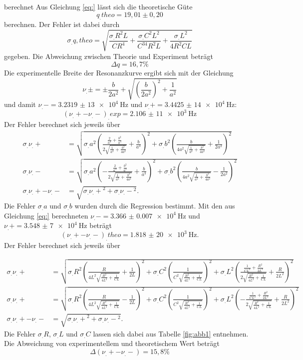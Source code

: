 berechnet
Aus Gleichung \eqref{eq:} lässt sich die theoretische Güte 
\[
q_.{theo}=19,01\pm 0,20
\] 
berechnen.
Der Fehler ist dabei durch 
\[
\sigma_.{q,theo}=\sqrt{\frac{\sigma_.R^2L}{CR^4}+\frac{\sigma_.C^2L^2}{C^34R^2L}+\frac{\sigma_.L^2}{4R^2CL}}
\]
gegeben.
Die Abweichung zwischen Theorie und Experiment beträgt
\[
\Delta q = 16,7\%
\]
Die experimentelle Breite der Resonanzkurve ergibt sich mit der Gleichung 
\[
\nu_.{\pm}=\pm\frac{b}{2a^2}+\sqrt{\left(\frac{b}{2a^2}\right)^2+\frac{1}{a^2}}
\]
und damit $\nu_.-=\SI{3,2319(13)e4}{\hertz}$ und $\nu_.+=\SI{3,4425(14)e4}{\hertz}$:
\[
\left(\nu_.+-\nu_.-\right)_.{exp}=\SI{2,106(11)e3}{\hertz}
\]
Der Fehler berechnet sich jeweils über
\begin{align*}
\sigma_.{\nu_.+}&=\sqrt{\sigma_.a^2\left(\frac{\frac{2}{a^3}+\frac{b^2}{a^5}}{2\sqrt{\frac{1}{a^2}+\frac{b^2}{4a^2}}}+\frac{b}{a^3}\right)^2+\sigma_.b^2\left(\frac{b}{4a^2\sqrt{\frac{1}{a^2}+\frac{b^2}{4a^2}}}+\frac{1}{2a^2}\right)^2} \\
\sigma_.{\nu_.-}&=\sqrt{\sigma_.a^2\left(-\frac{\frac{2}{a^3}+\frac{b^2}{a^5}}{2\sqrt{\frac{1}{a^2}+\frac{b^2}{4a^2}}}+\frac{b}{a^3}\right)^2+\sigma_.b^2\left(\frac{b}{4a^2\sqrt{\frac{1}{a^2}+\frac{b^2}{4a^2}}}-\frac{1}{2a^2}\right)^2} \\
\sigma_.{\nu_.+-\nu_.-}&=\sqrt{\sigma_.{\nu_.+}^2+\sigma_.{\nu_.-}^2}\text{.}
\end{align*}
Die Fehler $\sigma_.a$ und $\sigma_.b$ wurden durch die Regression bestimmt.
Mit den aus Gleichung \eqref{eq:} berechneten $\nu_.-=\SI{3.366(7)e4}{\hertz}$ und 
$\nu_.+=\SI{3,548(7)e4}{\hertz}$ beträgt
\[
\left(\nu_.+-\nu_.-\right)_.{theo}=\SI{1,818(20)e3}{\hertz}\text{.}
\]
Der Fehler berechnet sich jeweils über

\begin{align*}
\sigma_.{\nu_.+}&=\sqrt{\sigma_.R^2\left(\frac{R}{4L^2\sqrt{\frac{R^2}{4L^2}+\frac{1}{CL}}}+\frac{1}{2L}\right)^2+\sigma_.C^2\left(\frac{1}{C^2\sqrt{\frac{R^2}{4L^2}+\frac{1}{CL}}}\right)^2+\sigma_.L^2\left(\frac{\frac{1}{CL^2}+\frac{R^2}{2L^3}}{2\sqrt{\frac{R^2}{4L^2}+\frac{1}{CL}}}+\frac{R}{2L^2}\right)^2} \\
\sigma_.{\nu_.+}&=\sqrt{\sigma_.R^2\left(\frac{R}{4L^2\sqrt{\frac{R^2}{4L^2}+\frac{1}{CL}}}-\frac{1}{2L}\right)^2+\sigma_.C^2\left(\frac{1}{C^2\sqrt{\frac{R^2}{4L^2}+\frac{1}{CL}}}\right)^2+\sigma_.L^2\left(-\frac{\frac{1}{CL^2}+\frac{R^2}{2L^3}}{2\sqrt{\frac{R^2}{4L^2}+\frac{1}{CL}}}+\frac{R}{2L^2}\right)^2} \\
\sigma_.{\nu_.+-\nu_.-}&=\sqrt{\sigma_.{\nu_.+}^2+\sigma_.{\nu_.-}^2}\text{.}
\end{align*}
Die Fehler $\sigma_.R$, $\sigma_.L$ und $\sigma_.C$ lassen sich dabei aus Tabelle \ref{fig:abb1} entnehmen.
Die Abweichung von experimentellem und theoretischem Wert beträgt
\[
\Delta\left(\nu_.+-\nu_.-\right)=15,8\%
\]

